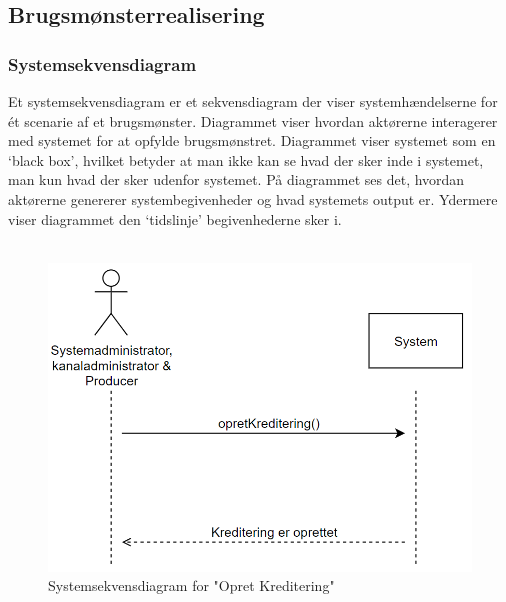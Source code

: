 \subsection{Brugsmønsterrealisering}

\subsubsection{Systemsekvensdiagram}
Et systemsekvensdiagram er et sekvensdiagram der viser systemhændelserne for ét scenarie af et brugsmønster. Diagrammet viser hvordan aktørerne interagerer med systemet for at opfylde brugsmønstret. Diagrammet viser systemet som en ‘black box’, hvilket betyder at man ikke kan se
hvad der sker inde i systemet, man kun hvad der sker udenfor systemet. På diagrammet ses det, hvordan aktørerne genererer systembegivenheder og hvad systemets output er. Ydermere viser diagrammet den ‘tidslinje’ begivenhederne sker i. \\
 \\


\begin{figure}[H]
\centering
\includegraphics[scale=0.4]{figures/systemsekvensdiagrammer/opretKreditering.PNG}
\caption{Systemsekvensdiagram for "Opret Kreditering"}
\label{fig:systemsekvensdiagram_opretKreditering}
\end{figure}


 \\

